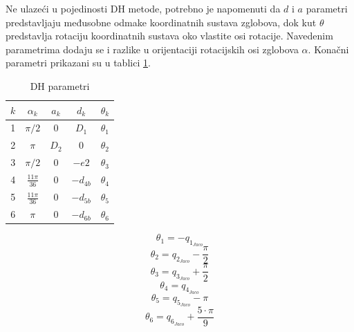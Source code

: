 \documentclass[times, utf8, diplomski, numeric]{fer}
\begin{document}

Ne ulazeći u pojedinosti DH metode, potrebno je napomenuti da $d$ i $a$ parametri predstavljaju međusobne odmake koordinatnih sustava zglobova, dok kut $\theta$ predstavlja rotaciju koordinatnih sustava oko vlastite osi rotacije. Navedenim parametrima dodaju se i razlike u orijentaciji rotacijskih osi zglobova $\alpha$. Konačni parametri prikazani su u tablici \ref{JacoDH}. 
 \begin{table}[H]
\centering
\caption{DH parametri} \label{JacoDH}
\begin{tabular}{c c c c c}
\hline\hline
$ k $ & $ \alpha_{k} $ & $ a_{k} $ & $ d_{k} $ & $ \theta_{k} $ \\
\hline
1 & $ \pi/2 $ & $ 0 $ & $ D_{1} $ & $ \theta_{1} $\\
2 & $ \pi $ & $ D_{2} $ & 0 & $ \theta_{2} $\\
3 & $ \pi/2 $ & 0 & $ -e2 $ & $ \theta_{3} $\\
4 & $ \frac{11\pi}{36} $ & 0 & $ -d_{4b} $ & $ \theta_{4} $\\
5 & $ \frac{11\pi}{36}  $ & 0 & $ -d_{5b} $ & $ \theta_{5} $\\
6 & $ \pi $ & 0 & $ -d_{6b} $ & $ \theta_{6} $\\
\hline
\end{tabular}
\end{table}
 \begin{equation}
\theta_{1}=-q_{1_{Jaco}}
\label{q1}
\end{equation}
\begin{equation}
\theta_{2}=q_{2_{Jaco}}-\frac{\pi}{2}
\label{q2}
\end{equation}
\begin{equation}
\theta_{3}=q_{3_{Jaco}}+\frac{\pi}{2}
\label{q3}
\end{equation}
\begin{equation}
\theta_{4}=q_{4_{Jaco}}
\label{q4}
\end{equation}
\begin{equation}
\theta_{5}=q_{5_{Jaco}}-\pi
\label{q5}
\end{equation}
\begin{equation}
\theta_{6}=q_{6_{Jaco}}+\dfrac{5\cdot \pi}{9}
\label{q6}
\end{equation}
\end{document}
